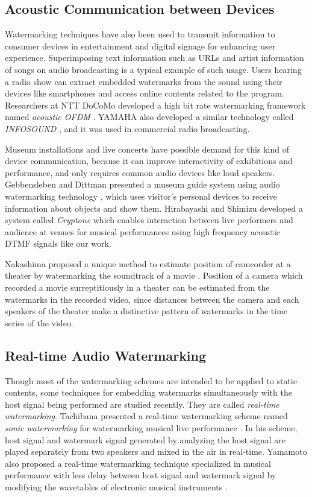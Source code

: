 \subsection{Acoustic Communication between Devices}
Watermarking techniques have also been used to transmit information to consumer devices in entertainment and digital signage for enhancing user experience.
Superimposing text information such as URLs and artist information of songs on audio broadcasting is a typical example of such usage.
Users hearing a radio show can extract embedded watermarks from the sound using their devices like smartphones and access online contents related to the program.
Researchers at NTT DoCoMo developed a high bit rate watermarking framework named {\it acoustic OFDM} \cite{matsuoka2008acoustic}. YAMAHA also developed a similar technology called {\it INFOSOUND} \cite{infosound}, and it was used in commercial radio broadcasting.

Museum installations and live concerts have possible demand for this kind of device communication, because it can improve interactivity of exhibitions and performance, and only requires common audio devices like loud speakers.
Gebbensleben and Dittman presented a museum guide system using audio watermarking technology \cite{gebbensleben2006multimodal}, which uses visitor's personal devices to receive information about objects and show them.
Hirabayashi and Shimizu developed a system called {\it Cryptone} which enables interaction between live performers and audience at venues for musical performances using high frequency acoustic DTMF signals like our work. \cite{Hirabayashi:2012:CIP:2407707.2407712}

Nakashima proposed a unique method to estimate position of camcorder at a theater by watermarking the soundtrack of a movie \cite{nakashima2009watermarked}.
Position of a camera which recorded a movie surreptitiously in a theater can be estimated from the watermarks in the recorded video, since distances between the camera and each speakers of the theater make a distinctive pattern of watermarks in the time series of the video.

\subsection{Real-time Audio Watermarking}
Though most of the watermarking schemes are intended to be applied to static contents, some techniques for embedding watermarks simultaneously with the host signal being performed are studied recently. They are called {\it real-time watermarking}.
Tachibana presented a real-time watermarking scheme named {\it sonic watermarking} for watermarking musical live performance \cite{tachibana2003audio}. In his scheme, host signal and watermark signal generated by analyzing the host signal are played separately from two speakers and mixed in the air in real-time.
Yamamoto also proposed a real-time watermarking technique specialized in musical performance with less delay between host signal and watermark signal by modifying the wavetables of electronic musical instruments \cite{yamamoto2010real}.
